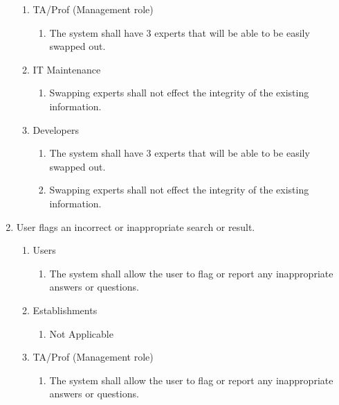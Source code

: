\documentclass[titlepage]{article}
\begin{document}
\begin{enumerate}[{BE1}]
\begin{enumerate}[{VP4.1}]
				\item TA/Prof (Management role)
				\begin{enumerate}
					\item The system shall have 3 experts that will be able to be easily swapped out.
				\end{enumerate}
				
				\item IT Maintenance
				\begin{enumerate}
					\item Swapping experts shall not effect the integrity of the existing information.
				\end{enumerate}
				
				\item Developers
				\begin{enumerate}
					\item The system shall have 3 experts that will be able to be easily swapped out.
					\item Swapping experts shall not effect the integrity of the existing information.
				\end{enumerate}
				
			\end{enumerate}
			
			\item User flags an incorrect or inappropriate search or result.
			\begin{enumerate}[{VP5.1}]
				
				\item Users
				\begin{enumerate}
					\item The system shall allow the user to flag or report any inappropriate answers or questions.
				\end{enumerate}
				
				\item Establishments
				\begin{enumerate}
					\item Not Applicable
				\end{enumerate}
				
				\item TA/Prof (Management role)
				\begin{enumerate}
					\item The system shall allow the user to flag or report any inappropriate answers or questions.
				\end{enumerate}
				

\end{enumerate}
\end{enumerate}
\end{document}
